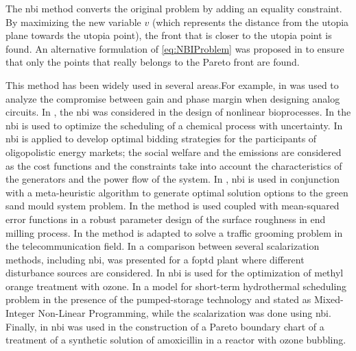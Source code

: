 The \gls{nbi} method converts the original problem by adding an equality constraint. By maximizing the new variable $v$ (which represents the distance from the utopia plane towards the utopia point), the front that is closer to the utopia point is found. An alternative formulation of \eqref{eq:NBIProblem} was proposed in \citet{Shukla2007} to ensure that only the points that really belongs to the Pareto front are found.

This method has been widely used in several areas.For example, in \citet{Stehr2003} was used to analyze the compromise between gain and phase margin when designing analog circuits. In \citet{Sendin2004}, the \gls{nbi} was considered in the design of nonlinear bioprocesses. In \citet{Ierapetritou2007a} the \gls{nbi} is used to optimize the scheduling of a chemical process with uncertainty. In \citet{Vahidinasab2010} \gls{nbi} is applied to develop optimal bidding strategies for the participants of oligopolistic energy markets; the social welfare and the emissions are considered as the cost functions and the constraints take into account the characteristics of the generators and the power flow of the system. In \citet{Ganesan2013}, \gls{nbi} is used in conjunction with a meta-heuristic algorithm to generate optimal solution options to the green sand mould system problem. In \citet{Brito2014} the method is used coupled with mean-squared error functions in a robust parameter design of the surface roughness in end milling process. In \citet{Rubio-Largo2014} the method is adapted to solve a traffic grooming problem in the telecommunication field. In \citet{Rojas2015b} a comparison between several scalarization methods, including \gls{nbi}, was presented for a \gls{foptd} plant where different disturbance sources are considered. In \citet{Naves2017} \gls{nbi} is used for the optimization of methyl orange treatment with ozone. In \citet{Simab2018} a model for short-term hydrothermal scheduling problem in the presence of the pumped-storage technology and stated as Mixed-Integer Non-Linear Programming, while the scalarization was done using \gls{nbi}. Finally, in \citet{Moura2018} \gls{nbi} was used in the construction of a Pareto boundary chart of a treatment of a synthetic solution of amoxicillin in a reactor with ozone bubbling.
